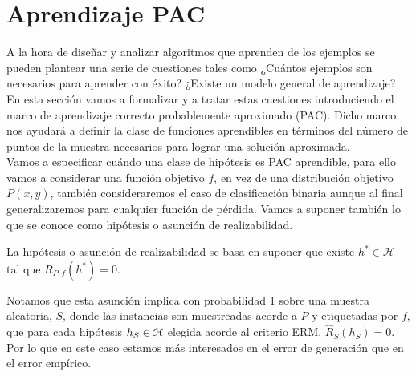 \section{Aprendizaje PAC}

    A la hora de diseñar y analizar algoritmos que aprenden de los ejemplos se pueden plantear una serie de cuestiones tales como ¿Cuántos ejemplos son necesarios para aprender con éxito? ¿Existe un modelo general de aprendizaje? En esta sección vamos a formalizar y a tratar estas cuestiones introduciendo el marco de aprendizaje correcto probablemente aproximado (PAC). Dicho marco nos ayudará a definir la clase de funciones aprendibles en términos del número de puntos de la muestra necesarios para lograr una solución aproximada. \\
    
    Vamos a especificar cuándo una clase de hipótesis es PAC aprendible, para ello vamos a considerar una función objetivo $f$, en vez de una distribución objetivo $P(x,y)$, también consideraremos el caso de clasificación binaria aunque al final generalizaremos para cualquier función de pérdida. Vamos a suponer también lo que se conoce como hipótesis o asunción de realizabilidad. \\
    
    
    \begin{definicion}
    La hipótesis o asunción de realizabilidad se basa en suponer que existe $h^* \in \mathcal{H}$ tal que $R_{P,f}(h^*) = 0$. 
    \end{definicion}
    
    \begin{observacion}
    Notamos que esta asunción implica con probabilidad 1 sobre una muestra aleatoria, $S$, donde las instancias son muestreadas acorde a $P$ y etiquetadas por $f$, que para cada hipótesis $h_S \in \mathcal{H}$ elegida acorde al criterio ERM, $\hat{R}_S(h_S) = 0$. Por lo que en este caso estamos más interesados en el error de generación que en el error empírico. \\
    \end{observacion}
    
